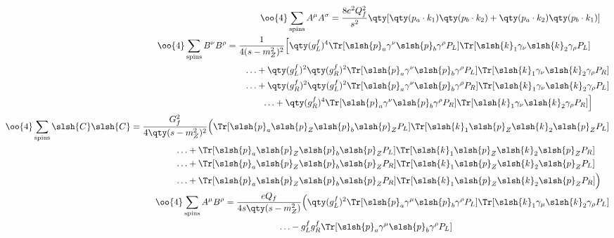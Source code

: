 \newpage
\begin{align}
	\begin{split}
		\oo{4}\sum_\text{spins}A^\mu A^\sigma&=\frac{8e^2Q_f^2}{s^2}\qty[\qty(p_a\cdot k_1)\qty(p_b\cdot k_2)+\qty(p_a\cdot k_2)\qty(p_b \cdot k_1)]
	\end{split}
	\\
	\begin{split}
		\oo{4}\sum_\text{spins}B^\nu B^\rho&=\frac{1}{4(s-m_Z^2)^2}
		\Big[
		\qty(g_L^f)^4
		\Tr[\slsh{p}_a\gamma^\nu \slsh{p}_b\gamma^\rho P_L]
		\Tr[\slsh{k}_1\gamma_\nu \slsh{k}_2\gamma_\rho P_L]
		\\&\qquad\ldots+
		\qty(g_L^f)^2\qty(g_R^f)^2
		\Tr[\slsh{p}_a\gamma^\nu \slsh{p}_b\gamma^\rho P_L]
		\Tr[\slsh{k}_1\gamma_\nu \slsh{k}_2\gamma_\rho P_R]
		\\&\qquad\ldots+
		\qty(g_R^f)^2\qty(g_L^f)^2
		\Tr[\slsh{p}_a\gamma^\nu \slsh{p}_b\gamma^\rho P_R]
		\Tr[\slsh{k}_1\gamma_\nu \slsh{k}_2\gamma_\rho P_L]
		\\&\qquad\qquad\ldots+
		\qty(g_R^f)^4
		\Tr[\slsh{p}_a\gamma^\nu \slsh{p}_b\gamma^\rho P_R]
		\Tr[\slsh{k}_1\gamma_\nu \slsh{k}_2\gamma_\rho P_R]
		\Big]
	\end{split}
	\\
	\begin{split}
		\oo{4}\sum_\text{spins}\slsh{C}\slsh{C}&=
		\frac{G_f^2}{4\qty(s-m_Z^2)^2}
		\Big(
		\Tr[\slsh{p}_a\slsh{p}_Z\slsh{p}_b\slsh{p}_ZP_L]
		\Tr[\slsh{k}_1\slsh{p}_Z\slsh{k}_2\slsh{p}_ZP_L]
		\\&\qquad\qquad\quad\ldots+
		\Tr[\slsh{p}_a\slsh{p}_Z\slsh{p}_b\slsh{p}_ZP_L]
		\Tr[\slsh{k}_1\slsh{p}_Z\slsh{k}_2\slsh{p}_ZP_R]
		\\&\qquad\qquad\quad\ldots+
		\Tr[\slsh{p}_a\slsh{p}_Z\slsh{p}_b\slsh{p}_ZP_R]
		\Tr[\slsh{k}_1\slsh{p}_Z\slsh{k}_2\slsh{p}_ZP_L]
		\\&\qquad\qquad\quad\ldots+
		\Tr[\slsh{p}_a\slsh{p}_Z\slsh{p}_b\slsh{p}_ZP_R]
		\Tr[\slsh{k}_1\slsh{p}_Z\slsh{k}_2\slsh{p}_ZP_R]
		\Big)
	\end{split}
	\\
	\begin{split}
		\oo{4}\sum_\text{spins}A^\mu B^\rho&=\frac{eQ_f}{4s\qty(s-m_Z^2)}
		\Big(
			\qty(g_L^f)^2
			\Tr[\slsh{p}_a\gamma^\mu \slsh{p}_b\gamma^\rho P_L]
			\Tr[\slsh{k}_1\gamma_\mu \slsh{k}_2\gamma_\rho P_L]
			\\
			&\qquad\qquad\qquad\ldots
			-g_L^fg_R^f
			\Tr[\slsh{p}_a\gamma^\mu \slsh{p}_b\gamma^\rho P_L]

\end{split}
\end{align}
